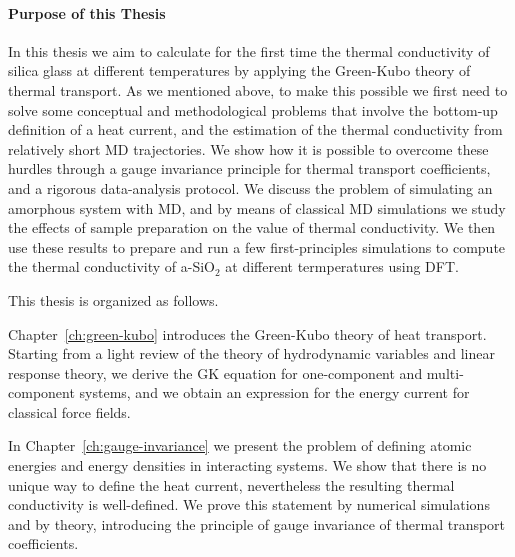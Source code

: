 \medskip
\begin{LEtext}
\paragraph{Purpose of this Thesis}
In this thesis we aim to calculate for the first time the thermal conductivity of silica glass at different temperatures by applying the \abinitio Green-Kubo theory of thermal transport. \LE{***}
As we mentioned above, to make this possible we first need to solve some conceptual and methodological problems that involve the bottom-up definition of a heat current, and the estimation of the thermal conductivity from relatively short MD trajectories. 
We show how it is possible to overcome these hurdles through a gauge invariance principle for thermal transport coefficients, and a rigorous data-analysis protocol. We discuss the problem of simulating an amorphous system with MD, and by means of classical MD simulations we study the effects of sample preparation on the value of thermal conductivity. 
We then use these results to prepare and run a few first-principles simulations to compute the \abinitio thermal conductivity of a-SiO$_2$ at different termperatures using DFT. 


\smallskip
This thesis is organized as follows. 

Chapter~\ref{ch:green-kubo} introduces the Green-Kubo theory of heat transport. 
Starting from a light review of the theory of hydrodynamic variables and linear response theory, we derive the GK equation for one-component and multi-component systems, and we obtain an expression for the energy current for classical force fields. 

In Chapter~\ref{ch:gauge-invariance} we present the problem of defining atomic energies and energy densities in interacting systems. We show that there is no unique way to define the heat current, nevertheless the resulting thermal conductivity is well-defined. We prove this statement by numerical simulations and by theory, introducing the principle of gauge invariance of thermal transport coefficients. 


\end{LEtext}
